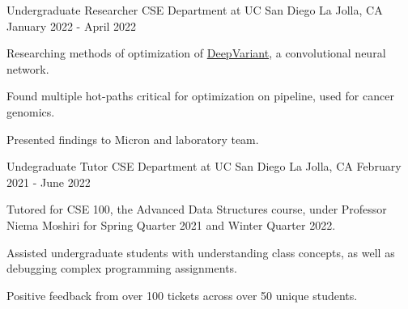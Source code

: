 
\begin{cventries}
    \cventry
      {Undergraduate Researcher}
      {CSE Department at UC San Diego}
      {La Jolla, CA}
      {January 2022 - April 2022}
      {
        \begin{cvitems}
          \item {Researching methods of optimization of \href{https://github.com/google/deepvariant}{DeepVariant}, a convolutional neural network.}
          \item {Found multiple hot-paths critical for optimization on pipeline, used for cancer genomics.}
          \item {Presented findings to Micron and laboratory team.}
        \end{cvitems}
      }
    \vspace{6mm}
    \cventry
      {Undegraduate Tutor}
      {CSE Department at UC San Diego}
      {La Jolla, CA}
      {February 2021 - June 2022}
      {
        \begin{cvitems}
          \item {Tutored for CSE 100, the Advanced Data Structures course, under Professor Niema Moshiri for Spring Quarter 2021 and Winter Quarter 2022.}
          \item {Assisted undergraduate students with understanding class concepts, as well as debugging complex programming assignments.}
          \item {Positive feedback from over 100 tickets across over 50 unique students.}
        \end{cvitems}
      }
\end{cventries}
